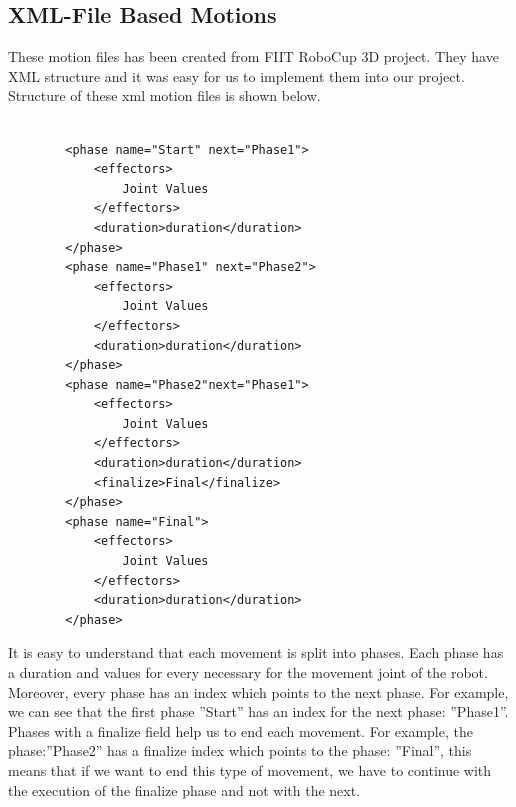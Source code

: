 \subsection{XML-File Based Motions}
These motion files has been created from FIIT RoboCup 3D project. They have XML structure and it was easy for us to implement them into our project. Structure of these xml motion files is shown below.
\begin{verbatim}

		<phase name="Start" next="Phase1">
			<effectors>
				Joint Values
			</effectors>
			<duration>duration</duration>
		</phase>
		<phase name="Phase1" next="Phase2">
			<effectors>
				Joint Values
			</effectors>
			<duration>duration</duration>
		</phase>
		<phase name="Phase2"next="Phase1">
			<effectors>
				Joint Values
			</effectors>
			<duration>duration</duration>
			<finalize>Final</finalize>
		</phase>
		<phase name="Final">
			<effectors>
				Joint Values
			</effectors>
			<duration>duration</duration>
		</phase>

\end{verbatim}
It is easy to understand that each movement is split into phases. Each phase has a duration and values for every necessary for the movement joint of the robot. Moreover, every phase has an index which points to the next phase. For example, we can see that the first phase ''Start'' has an index for the next phase: ''Phase1''. Phases with a finalize field help us to end each movement. For example, the phase:''Phase2'' has a finalize index which points to the phase: ''Final'', this means that if we want to end this type of movement, we have to continue with the execution of the finalize phase and not with the next.

